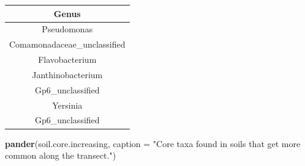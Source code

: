 \documentclass[]{article}
\newenvironment{Shaded}{\begin{snugshade}}{\end{snugshade}}
\newcommand{\KeywordTok}[1]{\textcolor[rgb]{0.13,0.29,0.53}{\textbf{#1}}}
\newcommand{\DataTypeTok}[1]{\textcolor[rgb]{0.13,0.29,0.53}{#1}}
\newcommand{\StringTok}[1]{\textcolor[rgb]{0.31,0.60,0.02}{#1}}
\newcommand{\NormalTok}[1]{#1}
\begin{document}
\begin{longtable}[]{@{}c@{}}
\toprule
\begin{minipage}[b]{0.39\columnwidth}\centering\strut
Genus\strut
\end{minipage}\tabularnewline
\midrule
\endhead
\begin{minipage}[t]{0.39\columnwidth}\centering\strut
Pseudomonas\strut
\end{minipage}\tabularnewline
\begin{minipage}[t]{0.39\columnwidth}\centering\strut
Comamonadaceae\_unclassified\strut
\end{minipage}\tabularnewline
\begin{minipage}[t]{0.39\columnwidth}\centering\strut
Flavobacterium\strut
\end{minipage}\tabularnewline
\begin{minipage}[t]{0.39\columnwidth}\centering\strut
Janthinobacterium\strut
\end{minipage}\tabularnewline
\begin{minipage}[t]{0.39\columnwidth}\centering\strut
Gp6\_unclassified\strut
\end{minipage}\tabularnewline
\begin{minipage}[t]{0.39\columnwidth}\centering\strut
Yersinia\strut
\end{minipage}\tabularnewline
\begin{minipage}[t]{0.39\columnwidth}\centering\strut
Gp6\_unclassified\strut
\end{minipage}\tabularnewline
\bottomrule
\end{longtable}

\begin{Shaded}
\begin{Highlighting}[]
\KeywordTok{pander}\NormalTok{(soil.core.increasing, }\DataTypeTok{caption =} \StringTok{"Core taxa found in soils that get more common along the transect."}\NormalTok{)}
\end{Highlighting}
\end{Shaded}
\end{document}
